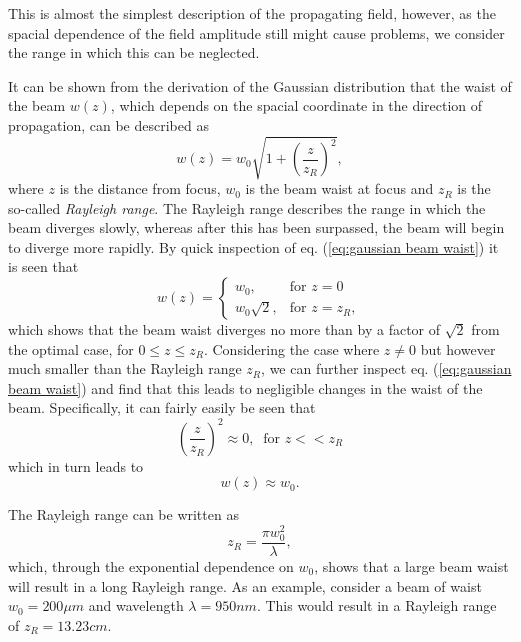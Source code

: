 This is almost the simplest description of the propagating field, however, as the spacial dependence of the field amplitude still might cause problems, we consider the range in which this can be neglected. 

It can be shown from the derivation of the Gaussian distribution that the waist of the beam $w(z)$, which depends on the spacial coordinate in the direction of propagation, can be described as \cite{Eichhorn}
\begin{equation}
    w(z) = w_0 \sqrt{1 + \left(\frac{z}{z_R}\right)^2},
    \label{eq:gaussian beam waist}
\end{equation}
where $z$ is the distance from focus, $w_0$ is the beam waist at focus and $z_R$ is the so-called \emph{Rayleigh range}. The Rayleigh range describes the range in which the beam diverges slowly, whereas after this has been surpassed, the beam will begin to diverge more rapidly. By quick inspection of eq. (\ref{eq:gaussian beam waist}) it is seen that
\begin{equation}
    w(z) = 
    \begin{cases}
        w_0, & \mbox{for } z=0 \\
        w_0\sqrt{2}, & \mbox{for } z=z_R,
    \end{cases}
\end{equation}
which shows that the beam waist diverges no more than by a factor of $\sqrt{2}$ from the optimal case, for $0\leq z \leq z_R$. Considering the case where $z \neq 0$ but however much smaller than the Rayleigh range $z_R$, we can further inspect eq. (\ref{eq:gaussian beam waist}) and find that this leads to negligible changes in the waist of the beam. Specifically, it can fairly easily be seen that
\begin{equation}
    \left(\frac{z}{z_R}\right)^2 \approx 0, \: \text{  for } z << z_R
\end{equation}
which in turn leads to 
\begin{equation}
    w(z) \approx w_0.
\end{equation}

The Rayleigh range can be written as \cite{Pedrotti}
\begin{equation}
    z_R = \frac{\pi w_0^2}{\lambda},
    \label{eq:Rayleigh range}
\end{equation}
which, through the exponential dependence on $w_0$, shows that a large beam waist will result in a long Rayleigh range. As an example, consider a beam of waist $w_0 = 200 \mu m$ and wavelength $\lambda = 950 nm$. This would result in a Rayleigh range of $z_R=13.23 cm$. 

